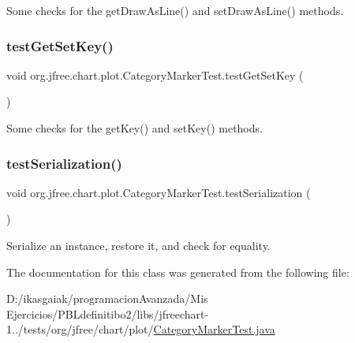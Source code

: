 Some checks for the get\+Draw\+As\+Line() and set\+Draw\+As\+Line() methods. \mbox{\label{classorg_1_1jfree_1_1chart_1_1plot_1_1_category_marker_test_a85f363a198b6ea23dee49e17cfacf379}} 
\subsubsection{\texorpdfstring{test\+Get\+Set\+Key()}{testGetSetKey()}}
{\footnotesize\ttfamily void org.\+jfree.\+chart.\+plot.\+Category\+Marker\+Test.\+test\+Get\+Set\+Key (\begin{DoxyParamCaption}{ }\end{DoxyParamCaption})}

Some checks for the get\+Key() and set\+Key() methods. \mbox{\label{classorg_1_1jfree_1_1chart_1_1plot_1_1_category_marker_test_a7b38827722959a71264196c5dd6bc47a}} 
\subsubsection{\texorpdfstring{test\+Serialization()}{testSerialization()}}
{\footnotesize\ttfamily void org.\+jfree.\+chart.\+plot.\+Category\+Marker\+Test.\+test\+Serialization (\begin{DoxyParamCaption}{ }\end{DoxyParamCaption})}

Serialize an instance, restore it, and check for equality. 

The documentation for this class was generated from the following file\+:\begin{DoxyCompactItemize}
\item 
D\+:/ikasgaiak/programacion\+Avanzada/\+Mis Ejercicios/\+P\+B\+Ldefinitibo2/libs/jfreechart-\/1../tests/org/jfree/chart/plot/\mbox{\hyperlink{_category_marker_test_8java}{Category\+Marker\+Test.\+java}}\end{DoxyCompactItemize}
